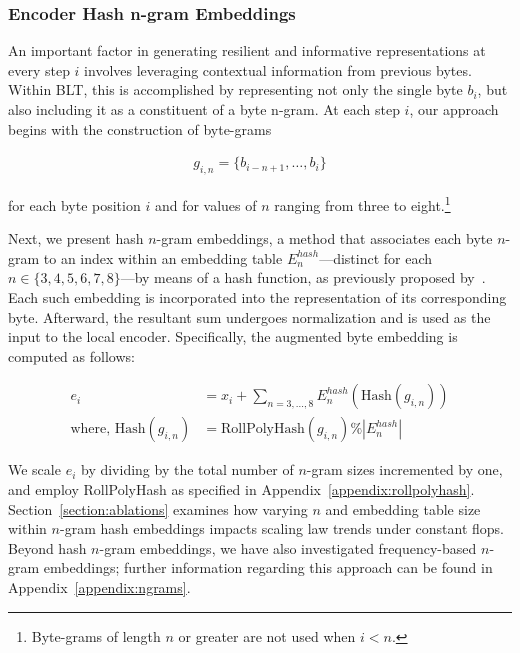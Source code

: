 \subsubsection{Encoder Hash n-gram Embeddings}
\label{sec:ngram-emb}
\label{sec:hash-emb}
An important factor in generating resilient and informative representations at every step $i$ involves leveraging contextual information from previous bytes. Within {\textsc BLT}, this is accomplished by representing not only the single byte $b_i$, but also including it as a constituent of a byte n-gram. At each step $i$, our approach begins with the construction of byte-grams

\begin{align}
    g_{i,n}=\{b_{i-n + 1},\ldots, b_i\}
\end{align}

for each byte position $i$ and for values of $n$ ranging from three to eight.\footnote{
Byte-grams of length $n$ or greater are not used when $i<n$. }

Next, we present hash $n$-gram embeddings, a method that associates each byte $n$-gram to an index within an embedding table $E_{n}^{hash}$—distinct for each $n \in\{3,4,5,6,7,8\}$—by means of a hash function, as previously proposed by~\citet{bai2010learning}. Each such embedding is incorporated into the representation of its corresponding byte. Afterward, the resultant sum undergoes normalization and is used as the input to the local encoder. Specifically, the augmented byte embedding is computed as follows:

\begin{align}
e_i &= x_i + \sum_{n = 3,...,8}E_{n}^{hash}(\text{Hash}(g_{i,n})) \\
\text{where, Hash}(g_{i,n}) &= \text{RollPolyHash}(g_{i,n}) \% |E_{n}^{hash}|
\end{align}

We scale $e_i$ by dividing by the total number of $n$-gram sizes incremented by one, and employ RollPolyHash as specified in Appendix~\ref{appendix:rollpolyhash}. Section~\ref{section:ablations} examines how varying $n$ and embedding table size within $n$-gram hash embeddings impacts scaling law trends under constant flops. Beyond hash $n$-gram embeddings, we have also investigated frequency-based $n$-gram embeddings; further information regarding this approach can be found in Appendix~\ref{appendix:ngrams}.

